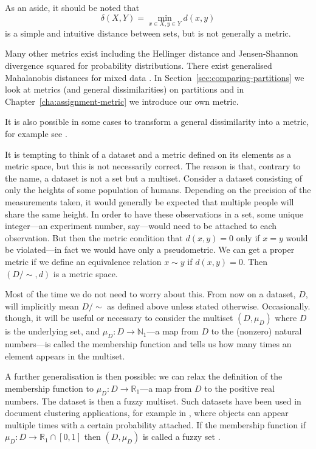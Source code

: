 \documentclass[a4paper]{report}
\newcommand{\dset}{D}
\begin{document}
As an aside, it should be noted that
\begin{equation*}
  \delta(X,Y) = \min_{x \in X, y \in Y} d(x,y)
\end{equation*}
is a simple and intuitive distance between sets, but is not generally a
metric.

Many other metrics exist including the Hellinger distance and Jensen-Shannon
divergence squared \citep{endres03metric} for probability distributions.
There exist generalised Mahalanobis distances for mixed data
\citep{leon2005generalized}.  In Section~\ref{sec:comparing-partitions} we
look at metrics (and general dissimilarities) on partitions and in
Chapter~\ref{cha:assignment-metric} we introduce our own metric.

It is also possible in some cases to transform a general dissimilarity into a
metric, for example see \citet[chap. 2.5]{everitt80}.

It is tempting to think of a dataset and a metric defined on its elements as a
metric space, but this is not necessarily correct.  The reason is that,
contrary to the name, a dataset is not a set but a multiset.  Consider a
dataset consisting of only the heights of some population of humans.
Depending on the precision of the measurements taken, it would generally be
expected that multiple people will share the same height.  In order to have
these observations in a set, some unique integer---an experiment number,
say---would need to be attached to each observation.  But then the metric
condition that $d(x,y)=0$ only if $x=y$ would be violated---in fact we would
have only a pseudometric.  We can get a proper metric if we define an
equivalence relation $x \sim y$ if $d(x,y)=0$.  Then $(\dset/\sim,d)$ is a
metric space.

Most of the time we do not need to worry about this.  From now on a dataset,
$\dset$, will implicitly mean $\dset/\sim$ as defined above unless stated
otherwise.  Occasionally. though, it will be useful or necessary to consider
the multiset $(\dset,\mu_{\dset})$ where $\dset$ is the underlying set, and
$\mu_{\dset} \colon \dset \to \mathbb{N}_1$---a map from $\dset$ to the
(nonzero) natural numbers---is called the membership function and tells us how
many times an element appears in the multiset.

A further generalisation is then possible: we can relax the definition of the
membership function to $\mu_{\dset} \colon \dset \to \mathbb{R}_1$---a map
from $\dset$ to the positive real numbers.  The dataset is then a fuzzy
multiset.  Such datasets have been used in document clustering applications,
for example in \citep{miyamoto2003information}, where objects can appear
multiple times with a certain probability attached.  If the membership
function if $\mu_{\dset} \colon \dset \to \mathbb{R}_1 \cap [0,1]$ then
$(\dset,\mu_{\dset})$ is called a fuzzy set
\citep{zadeh1965fuzzy,gottwald2010fuzzy}.
\end{document}

